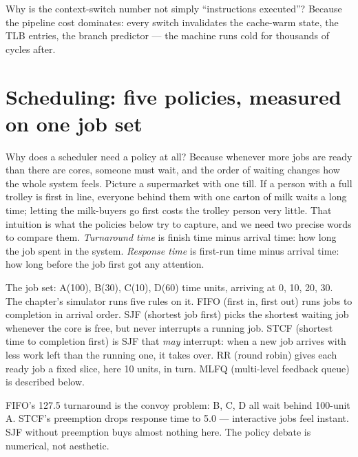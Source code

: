 \begin{checkpoint}
Why is the context-switch number not simply ``instructions
executed''? Because the pipeline cost dominates: every switch
invalidates the cache-warm state, the TLB entries, the branch
predictor --- the machine runs cold for thousands of cycles after.
\end{checkpoint}

\section{Scheduling: five policies, measured on one job set}
\label{sec:sched12}

Why does a scheduler need a policy at all? Because whenever more
jobs are ready than there are cores, someone must wait, and the order
of waiting changes how the whole system feels. Picture a supermarket
with one till. If a person with a full trolley is first in line,
everyone behind them with one carton of milk waits a long time;
letting the milk-buyers go first costs the trolley person very
little. That intuition is what the policies below try to capture, and
we need two precise words to compare them. \emph{Turnaround time} is
finish time minus arrival time: how long the job spent in the system.
\emph{Response time} is first-run time minus arrival time: how long
before the job first got any attention.

The job set: A(100), B(30), C(10), D(60) time units, arriving at
0, 10, 20, 30. The chapter's simulator runs five rules on it. FIFO
(first in, first out) runs jobs to completion in arrival order. SJF
(shortest job first) picks the shortest waiting job whenever the
core is free, but never interrupts a running job. STCF (shortest
time to completion first) is SJF that \emph{may} interrupt: when a
new job arrives with less work left than the running one, it takes
over. RR (round robin) gives each ready job a fixed slice, here 10
units, in turn. MLFQ (multi-level feedback queue) is described
below.





\begin{example}
FIFO's 127.5 turnaround is the convoy problem: B, C, D all wait
behind 100-unit A. STCF's preemption drops response time to 5.0 ---
interactive jobs feel instant. SJF without preemption buys almost
nothing here. The policy debate is numerical, not aesthetic.
\end{example}

